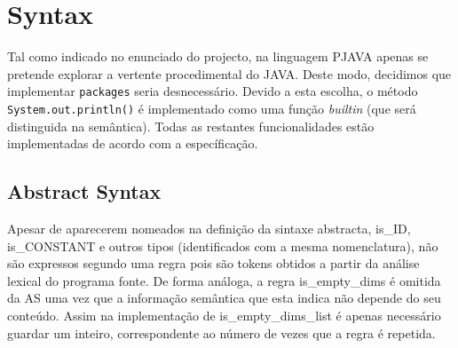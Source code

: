 \documentclass[a4paper]{article}
\title{\documentTitle}
\author{\documentAuthors{}}
\begin{document}
\renewcommand{\figurename}{Figure}
\maketitle
\cleardoublepage

\tableofcontents
\cleardoublepage

\setlength{\parindent}{1cm}
\setlength{\parskip}{0.3cm}

\section {Syntax}
\indent \indent Tal como indicado no enunciado do projecto, na linguagem PJAVA apenas se pretende explorar a vertente procedimental do JAVA. 
Deste modo, decidimos que implementar \texttt{packages} seria desnecessário.
Devido a esta escolha, o método \texttt{System.out.println()} é implementado como uma função \emph{builtin} (que será distinguida na semântica). 
Todas as restantes funcionalidades estão implementadas de acordo com a específicação.

\cleardoublepage
\subsection{Abstract Syntax}
\indent \indent Apesar de aparecerem nomeados na definição da sintaxe abstracta, is\_ID, \\
is\_CONSTANT e outros tipos (identificados com a mesma nomenclatura),
não são expressos segundo uma regra pois são tokens obtidos a partir da análise lexical do programa fonte.
De forma análoga, a regra is\_empty\_dims é omitida da AS uma vez que a informação semântica que esta indica não depende do seu conteúdo.
Assim na implementação de is\_empty\_dims\_list é apenas necessário guardar um inteiro, correspondente ao número de vezes que a regra é repetida.
\end{document}
